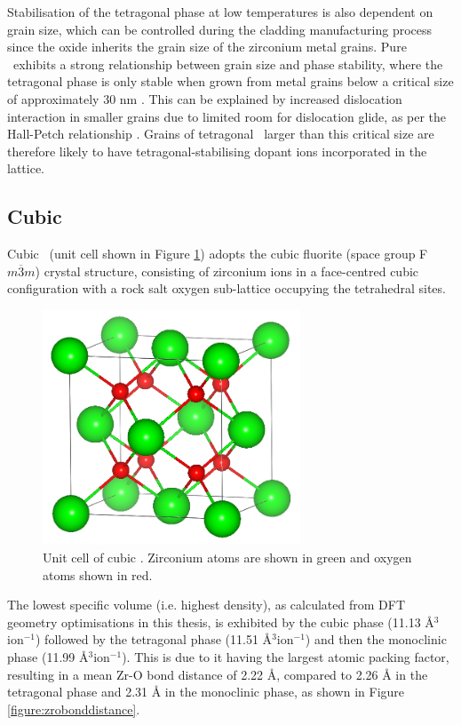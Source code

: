 Stabilisation of the tetragonal phase at low temperatures is also dependent on grain size, which can be controlled during the cladding manufacturing process since the oxide inherits the grain size of the zirconium metal grains. Pure \zirconia\ exhibits a strong relationship between grain size and phase stability, where the tetragonal phase is only stable when grown from metal grains below a critical size of approximately 30 nm \cite{barberis1995zirconia}. This can be explained by increased dislocation interaction in smaller grains due to limited room for dislocation glide, as per the Hall-Petch relationship \cite{hall1951deformation, petch1953cleavage}. Grains of tetragonal \zirconia\ larger than this critical size are therefore likely to have tetragonal-stabilising dopant ions incorporated in the lattice.

\subsection{Cubic}

Cubic \zirconia\ (unit cell shown in Figure \ref{fig:cubic_unitcell}) adopts the cubic fluorite (space group F$m\overline{3}m$) crystal structure, consisting of zirconium ions in a face-centred cubic configuration with a rock salt oxygen sub-lattice occupying the tetrahedral sites.

\begin{figure}[ht]
  \centering
      \includegraphics[height=7cm]{images/cubic_unitcell.png}
  \caption{Unit cell of cubic \zirconia . Zirconium atoms are shown in green and oxygen atoms shown in red.}
  \label{fig:cubic_unitcell}
\end{figure}

The lowest specific volume (i.e. highest density), as calculated from DFT geometry optimisations in this thesis, is exhibited by the cubic phase (11.13 \r{A}$^{3}$ion$^{-1}$) followed by the tetragonal phase (11.51 \r{A}$^{3}$ion$^{-1}$) and then the monoclinic phase (11.99 \r{A}$^{3}$ion$^{-1}$). This is due to it having the largest atomic packing factor, resulting in a mean Zr-O bond distance of 2.22 \r{A}, compared to 2.26 \r{A} in the tetragonal phase and 2.31 \r{A} in the monoclinic phase, as shown in Figure \ref{figure:zrobonddistance}. 

